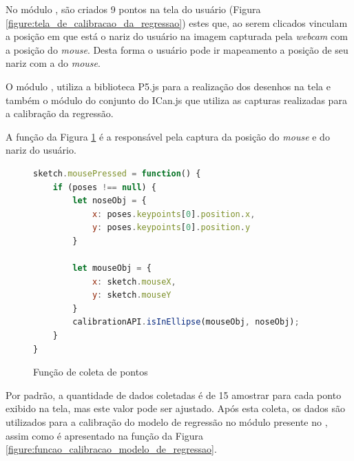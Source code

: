 \par No módulo , são criados 9 pontos na tela do usuário (Figura \ref{figure:tela_de_calibracao_da_regressao}) estes que, ao serem clicados vinculam a posição em que está o nariz do usuário na imagem capturada pela \textit{webcam} com a posição do \textit{mouse}. Desta forma o usuário pode ir mapeamento a posição de seu nariz com a do \textit{mouse}.


\par O módulo , utiliza a biblioteca P5.js para a realização dos desenhos na tela e também o módulo  do conjunto  do ICan.js que utiliza as capturas realizadas para a calibração da regressão.

\par A função da Figura \ref{figure:funcao_coleta_de_pontos_calibracao} é a responsável pela captura da posição do \textit{mouse} e do nariz do usuário.

\begin{figure}[H]
    \centering
    \begin{lstlisting}[language=JavaScript]
sketch.mousePressed = function() {
    if (poses !== null) {
        let noseObj = {
            x: poses.keypoints[0].position.x,
            y: poses.keypoints[0].position.y
        }
        
        let mouseObj = {
            x: sketch.mouseX,
            y: sketch.mouseY
        }
        calibrationAPI.isInEllipse(mouseObj, noseObj);
    } 
}
    \end{lstlisting}
    \caption{Função de coleta de pontos}
    \label{figure:funcao_coleta_de_pontos_calibracao}
\end{figure}

\par Por padrão, a quantidade de dados coletadas é de 15 amostrar para cada ponto exibido na tela, mas este valor pode ser ajustado. Após esta coleta, os dados são utilizados para a calibração do modelo de regressão no módulo  presente no , assim como é apresentado na função da Figura \ref{figure:funcao_calibracao_modelo_de_regressao}.

